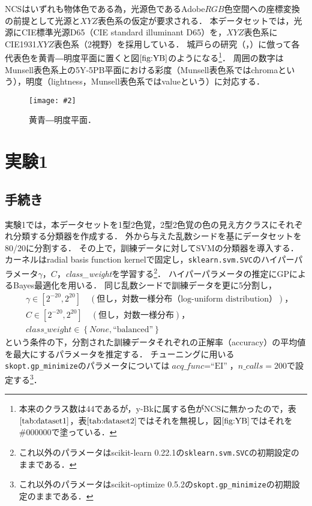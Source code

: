 \documentclass[uplatex,paper=a4,fontsize=4.0truemm,jafontsize=4.0truemm,head_space=30.0truemm,baselineskip=8.0truemm,gutter=25.0truemm,oneside,fleqn,hanging_panctuation,open_bracket_pos=nibu_tentsuki,dvipdfmx,jis2004,book,titlepage]{jlreq}
\theoremstyle{mystyle}
\newcommand{\figureinput}[4]{\begin{figure}[tbp]\centering\texttt{[image: \#2]}\caption{#3．}\label{fig:#4}\end{figure}}
\newcommand{\mathdisplaystyle}[1]{\(\displaystyle{#1}\)}
\newcommand{\Reference}[1]{\mathdisplaystyle{\ref{#1}}}
\newcommand{\negativevalue}[1]{{-#1}}
\newcommand{\parentheses}[1]{\left(#1\right)}
\newcommand{\braces}[1]{\left\{#1\right\}}
\newcommand{\squarebrackets}[1]{\left[#1\right]}
\begin{document}
			NCSはいずれも物体色である為，光源色であるAdobe\mathdisplaystyle{RGB}色空間への座標変換の前提として光源と\mathdisplaystyle{XYZ}表色系の仮定が要求される．
			本データセットでは，光源にCIE標準光源D65（CIE standard illuminant D65）を，\mathdisplaystyle{XYZ}表色系にCIE1931\mathdisplaystyle{XYZ}表色系（2\textdegree 視野）\cite[pp.~28--30]{Yaguchi2017a}を採用している．
			城戸らの研究（\cite[図1]{Kido2017}，\cite[図1]{Kido2018}）に倣って各代表色を黄青―明度平面に置くと図\Reference{fig:YB}のようになる\footnote{本来のクラス数は44であるが，y-Bkに属する色がNCSに無かったので，表\Reference{tab:dataset1}，表\Reference{tab:dataset2}ではそれを無視し，図\Reference{fig:YB}ではそれを\#000000で塗っている．}．
			周囲の数字はMunsell表色系上の5Y-5PB平面における彩度（Munsell表色系ではchromaという），明度（lightness，Munsell表色系ではvalueという）に対応する．
			\figureinput{width=\linewidth}{D:/a/figs/YB.png}{黄青―明度平面}{YB}
		\section{実験1}
			\subsection{手続き}
				実験1では，本データセットを1型2色覚，2型2色覚の色の見え方クラスにそれぞれ分類する分類器を作成する．
				外から与えた乱数シードを基にデータセットを80/20に分割する．
				その上で，訓練データに対してSVMの分類器を導入する．
				カーネルはradial basis function kernelで固定し，\texttt{sklearn{.}svm{.}SVC}のハイパーパラメータ\mathdisplaystyle{\gamma}，\mathdisplaystyle{C}，\textit{class\_weight}を学習する\footnote{これ以外のパラメータはscikit-learn 0.22.1の\texttt{sklearn{.}svm{.}SVC}の初期設定のままである．}．
				ハイパーパラメータの推定にGPによるBayes最適化を用いる．
				同じ乱数シードで訓練データを更に5分割し，
				\begin{align}
					&\gamma\in\squarebrackets{2^\negativevalue{20},2^{20}}\quad\parentheses{\textrm{但し，対数一様分布（log-uniform distribution）}}\textrm{，}\label{eq:gamma}\\
					&C\in\squarebrackets{2^\negativevalue{20},2^{20}}\quad\parentheses{\textrm{但し，対数一様分布}}\textrm{，}\label{eq:C}\\
					&\textit{class\_weight}\in\braces{\textit{None},\textrm{``balanced''}}\label{eq:classweight}
				\end{align}
				という条件の下，分割された訓練データそれぞれの正解率（accuracy）の平均値を最大にするパラメータを推定する．
				チューニングに用いる\texttt{skopt{.}gp\_minimize}のパラメータについては\mathdisplaystyle{\textit{acq\_func}=\textrm{``EI''}}，\mathdisplaystyle{\textit{n\_calls}=200}で設定する\footnote{これ以外のパラメータはscikit-optimize 0.5.2の\texttt{\texttt{skopt{.}gp\_minimize}}の初期設定のままである．}．
\end{document}

